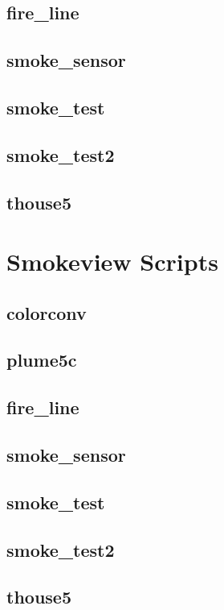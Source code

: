 \documentclass[11pt,twoside]{book}
\newcommand{\fdsinput}[1]{
{
\scriptsize

}
}
\begin{document}
\section{fire\_line}
\label{FDSfireline}
\fdsinput{fire_line.fds}

\section{smoke\_sensor}
\label{FDSsmokesensor}
\fdsinput{smoke_sensor.fds}

\section{smoke\_test}
\label{FDSsmoketest}
\fdsinput{smoke_test.fds}

\section{smoke\_test2}
\label{FDSsmoketest2}
\fdsinput{smoke_test2.fds}

\section{thouse5}
\label{FDSthouse5}
\fdsinput{thouse5.fds}

\chapter{Smokeview Scripts}
\section{colorconv}
\label{SSFcolorconv}
\fdsinput{colorconv.ssf}

\section{plume5c}
\label{SSFplume5c}
\fdsinput{plume5c.ssf}

\section{fire\_line}
\label{SSFfireline}
\fdsinput{fire_line.ssf}

\section{smoke\_sensor}
\label{SSFsmokesensor}
\fdsinput{smoke_sensor.ssf}

\section{smoke\_test}
\label{SSFsmoketest}
\fdsinput{smoke_test.ssf}

\section{smoke\_test2}
\label{SSFsmoketest2}
\fdsinput{smoke_test2.ssf}

\section{thouse5}
\label{SSFthouse5}
\fdsinput{thouse5.ssf}
\end{document}
